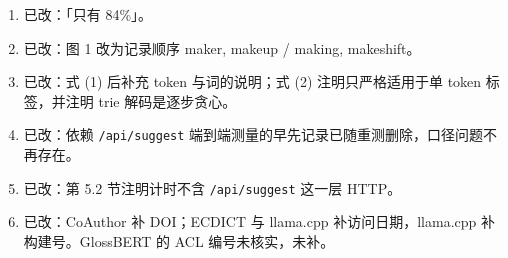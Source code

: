 \documentclass[11pt,a4paper,fontset=windows]{ctexart}
\newcommand{\code}[1]{\texttt{#1}}
\begin{document}
\begin{enumerate}
\item[C16] 已改：「只有 84\%」。
\item[C17] 已改：图 1 改为记录顺序 maker, makeup / making, makeshift。
\item[C18] 已改：式 (1) 后补充 token 与词的说明；式 (2) 注明只严格适用于单 token 标签，并注明 trie 解码是逐步贪心。
\item[C19] 已改：依赖 \code{/api/suggest} 端到端测量的早先记录已随重测删除，口径问题不再存在。
\item[C20] 已改：第 5.2 节注明计时不含 \code{/api/suggest} 这一层 HTTP。
\item[C21] 已改：CoAuthor 补 DOI；ECDICT 与 llama.cpp 补访问日期，llama.cpp 补构建号。GlossBERT 的 ACL 编号未核实，未补。
\end{enumerate}
\end{document}
